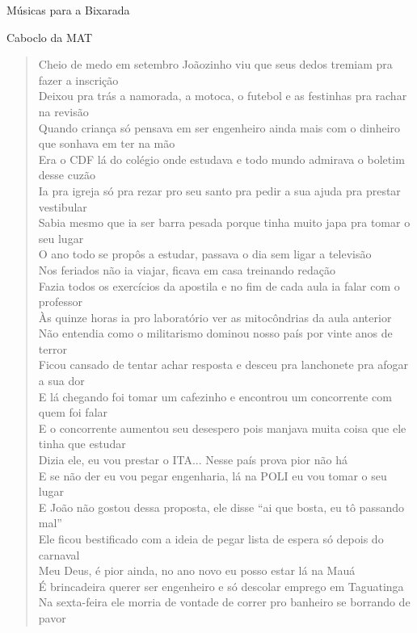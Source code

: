 \begin{secao}{Músicas para a Bixarada}
\begin{subsecao}{Caboclo da MAT}
\begin{verse}
\footnotesize{
Cheio de medo em setembro Joãozinho viu que seus dedos tremiam pra fazer a
inscrição\\
Deixou pra trás a namorada, a motoca, o futebol e as festinhas pra rachar na
revisão\\
Quando criança só pensava em ser engenheiro ainda mais com o dinheiro que
sonhava em ter na mão\\
Era o CDF lá do colégio onde estudava e todo mundo admirava o boletim desse
cuzão\\
Ia pra igreja só pra rezar pro seu santo pra pedir a sua ajuda pra prestar
vestibular\\
Sabia mesmo que ia ser barra pesada porque tinha muito japa pra tomar o seu
lugar\\
O ano todo se propôs a estudar, passava o dia sem ligar a televisão\\
Nos feriados não ia viajar, ficava em casa treinando redação\\
Fazia todos os exercícios da apostila e no fim de cada aula ia falar com o
professor\\
Às quinze horas ia pro laboratório ver as mitocôndrias da aula anterior\\
Não entendia como o militarismo dominou nosso país por vinte anos de terror\\
Ficou cansado de tentar achar resposta e desceu pra lanchonete pra afogar a sua
dor\\
E lá chegando foi tomar um cafezinho e encontrou um concorrente com quem foi
falar\\
E o concorrente aumentou seu desespero pois manjava muita coisa que ele tinha
que estudar\\
Dizia ele, eu vou prestar o ITA... Nesse país prova pior não há\\
E se não der eu vou pegar engenharia, lá na POLI eu vou tomar o seu lugar\\
E João não gostou dessa proposta, ele disse ``ai que bosta, eu tô passando mal''\\
Ele ficou bestificado com a ideia de pegar lista de espera só depois do carnaval\\
Meu Deus, é pior ainda, no ano novo eu posso estar lá na Mauá\\
É brincadeira querer ser engenheiro e só descolar emprego em Taguatinga\\
Na sexta-feira ele morria de vontade de correr pro banheiro se borrando de pavor\\
}
\end{verse}
\end{subsecao}
\end{secao}
